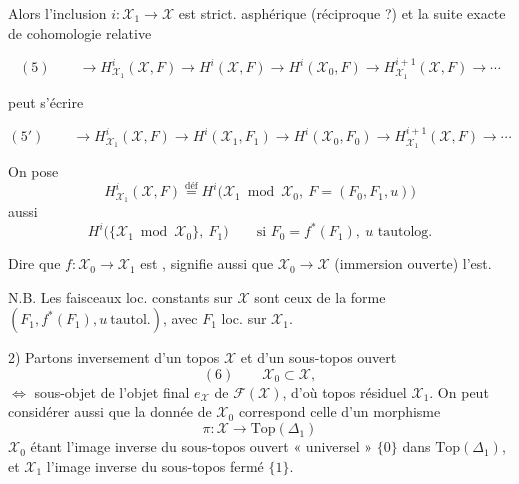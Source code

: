 \documentclass[11pt,a4paper]{article}
\begin{document}
Alors l'inclusion $i : \mathcal{X}_1 \longrightarrow \mathcal{X}$ est strict.
asphérique (réciproque ?) et la suite exacte de cohomologie relative


\[
(5) \qquad \longrightarrow H^{i}_{\mathcal{X}_1}(\mathcal{X}, F) \longrightarrow H^{i}(\mathcal{X}, F) \longrightarrow H^{i}(\mathcal{X}_0, F) \longrightarrow H^{i+1}_{\mathcal{X}_1}(\mathcal{X}, F) \longrightarrow \cdots
\]

peut s'écrire

\[
(5') \qquad \longrightarrow H^{i}_{\mathcal{X}_1}(\mathcal{X}, F) \longrightarrow H^{i}(\mathcal{X}_1, F_1) \longrightarrow H^{i}(\mathcal{X}_0, F_0) \longrightarrow H^{i+1}_{\mathcal{X}_1}(\mathcal{X}, F) \longrightarrow \cdots
\]

On pose
\[
H^{i}_{\mathcal{X}_1}(\mathcal{X}, F) \overset{\text{déf}}{=} H^{i}\bigl(\mathcal{X}_1 \bmod \mathcal{X}_0,\ F = (F_0, F_1, u)\bigr)
\]
\ill{} aussi \struck{\ill{}}
\[
H^{i}\bigl(\{\mathcal{X}_1 \bmod \mathcal{X}_0\},\ F_1\bigr) \qquad \text{si } F_0 = f^{*}(F_1),\ u \text{ tautolog.}
\]


Dire que $f : \mathcal{X}_0 \longrightarrow \mathcal{X}_1$ est
 , signifie aussi que
$\mathcal{X}_0 \longrightarrow \mathcal{X}$ (immersion ouverte) l'est.

N.B. Les faisceaux loc. constants sur $\mathcal{X}$ sont ceux de la forme
$(F_1, f^{*}(F_1), u\ \text{tautol.})$, avec $F_1$ loc.  sur
$\mathcal{X}_1$.


2) Partons inversement d'un topos $\mathcal{X}$ et d'un sous-topos ouvert
\[
(6) \qquad \mathcal{X}_0 \subset \mathcal{X},
\]
$\Longleftrightarrow$ sous-objet de l'objet final $e_{\mathcal{X}}$ de
$\mathcal{F}(\mathcal{X})$, d'où topos résiduel $\mathcal{X}_1$. On peut
considérer aussi que la donnée de $\mathcal{X}_0$ correspond \ill{} celle
d'un morphisme
\[
\pi : \mathcal{X} \longrightarrow \mathrm{Top}(\Delta_1)
\]
$\mathcal{X}_0$ étant l'image inverse du sous-topos ouvert « universel »
$\{0\}$ dans $\mathrm{Top}(\Delta_1)$, et $\mathcal{X}_1$ \struck{\ill{}}
l'image inverse du sous-topos fermé $\{1\}$.
\end{document}

